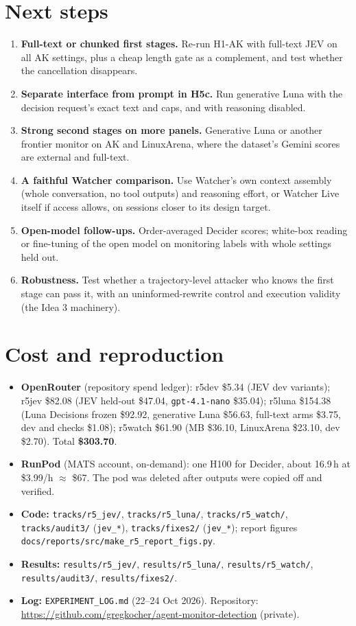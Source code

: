 \documentclass[11pt]{article}
\begin{document}
\section{Next steps}\label{sec:next}
\begin{enumerate}
\item \textbf{Full-text or chunked first stages.} Re-run H1-AK with full-text JEV on all AK settings, plus a cheap length gate as a complement, and test whether the cancellation disappears.
\item \textbf{Separate interface from prompt in H5c.} Run generative Luna with the decision request's exact text and caps, and with reasoning disabled.
\item \textbf{Strong second stages on more panels.} Generative Luna or another frontier monitor on AK and LinuxArena, where the dataset's Gemini scores are external and full-text.
\item \textbf{A faithful Watcher comparison.} Use Watcher's own context assembly (whole conversation, no tool outputs) and reasoning effort, or Watcher Live itself if access allows, on sessions closer to its design target.
\item \textbf{Open-model follow-ups.} Order-averaged Decider scores; white-box reading or fine-tuning of the open model on monitoring labels with whole settings held out.
\item \textbf{Robustness.} Test whether a trajectory-level attacker who knows the first stage can pass it, with an uninformed-rewrite control and execution validity (the Idea 3 machinery).
\end{enumerate}

\section*{Cost and reproduction}
\begin{itemize}
\item \textbf{OpenRouter} (repository spend ledger): r5dev \$5.34 (JEV dev variants); r5jev \$82.08 (JEV held-out \$47.04, \texttt{gpt-4.1-nano} \$35.04); r5luna \$154.38 (Luna Decisions frozen \$92.92, generative Luna \$56.63, full-text arms \$3.75, dev and checks \$1.08); r5watch \$61.90 (MB \$36.10, LinuxArena \$23.10, dev \$2.70). Total \textbf{\$303.70}.
\item \textbf{RunPod} (MATS account, on-demand): one H100 for Decider, about 16.9\,h at \$3.99/h $\approx$ \$67. The pod was deleted after outputs were copied off and verified.
\item \textbf{Code:} \texttt{tracks/r5\_jev/}, \texttt{tracks/r5\_luna/}, \texttt{tracks/r5\_watch/}, \texttt{tracks/audit3/} (\texttt{jev\_*}), \texttt{tracks/fixes2/} (\texttt{jev\_*}); report figures \texttt{docs/reports/src/make\_r5\_report\_figs.py}.
\item \textbf{Results:} \texttt{results/r5\_jev/}, \texttt{results/r5\_luna/}, \texttt{results/r5\_watch/}, \texttt{results/audit3/}, \texttt{results/fixes2/}.
\item \textbf{Log:} \texttt{EXPERIMENT\_LOG.md} (22--24 Oct 2026). Repository: \url{https://github.com/gregkocher/agent-monitor-detection} (private).
\end{itemize}
\end{document}
